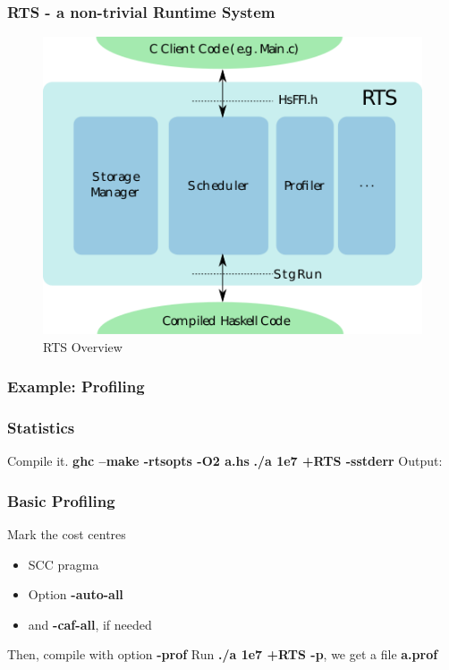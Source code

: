 \documentclass{beamer}
\newcommand{\inlineshell}[1]{\textcolor{shellcolor}{\textbf{#1}}}
\begin{document}

\begin{frame}
\frametitle{RTS - a non-trivial Runtime System}
\begin{figure}[hbt!]
\begin{center}
\includegraphics[height=0.6\textheight]{./pic/rts-overview.png}
\caption{RTS Overview}
\end{center}
\end{figure}
\end{frame}


\begin{frame}
\frametitle{Example: Profiling}
\end{frame}


\begin{frame}
\frametitle{Statistics}
Compile it.\newline
\inlineshell{ghc --make -rtsopts -O2 a.hs}\newline
\inlineshell{./a 1e7 +RTS -sstderr}\newline\newline
Output:\newline
{}
\end{frame}


\begin{frame}
\frametitle{Basic Profiling}
Mark the cost centres
\begin{itemize}
    \item SCC pragma
    \item Option \inlineshell{-auto-all}
    \item and \inlineshell{-caf-all}, if needed
\end{itemize}\bigskip

Then, compile with option \inlineshell{-prof}\newline
Run \inlineshell{./a 1e7 +RTS -p}, we get a file \inlineshell{a.prof}
\end{frame}
\end{document}
